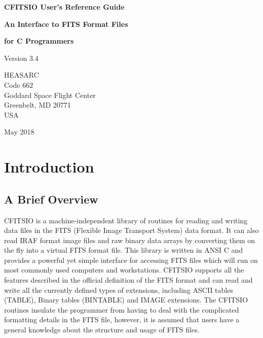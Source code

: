\documentclass[11pt]{book}
\begin{document}

\begin{titlepage}
\normalsize
\vspace*{4.0cm}
\begin{center}
{\Huge \bf CFITSIO User's Reference Guide}\\
\end{center}
\medskip 
\medskip 
\begin{center}
{\LARGE \bf An Interface to FITS Format Files}\\
\end{center}
\begin{center}
{\LARGE \bf for C Programmers}\\
\end{center}
\medskip
\medskip
\begin{center}
{\Large Version 3.4 \\}
\end{center}
\bigskip
\vskip 2.5cm
\begin{center}
{HEASARC\\
Code 662\\
Goddard Space Flight Center\\
Greenbelt, MD 20771\\
USA}
\end{center}

\vfill
\bigskip
\begin{center}
{\Large May 2018\\}
\end{center}
\vfill
\end{titlepage}

\clearpage

\tableofcontents
\chapter{Introduction }


\section{ A Brief Overview}

CFITSIO is a machine-independent library of routines for reading and
writing data files in the FITS (Flexible Image Transport System) data
format.  It can also read IRAF format image files and raw binary data
arrays by converting them on the fly into a virtual FITS format file.
This library is written in ANSI C and provides a powerful yet simple
interface for accessing FITS files which will run on most commonly used
computers and workstations.  CFITSIO supports all the features
described in the official definition of the FITS format and can
read and write all the currently defined types of extensions, including
ASCII tables (TABLE), Binary tables (BINTABLE) and IMAGE extensions.
The CFITSIO routines insulate the programmer from having to deal with
the complicated formatting details in the FITS file, however, it is
assumed that users have a general knowledge about the structure and
usage of FITS files.
\end{document}
